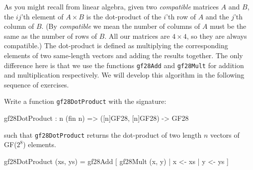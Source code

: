 As you might recall from linear algebra, given two \emph{compatible}
matrices $A$ and $B$, the $ij$'th element of $A\times B$ is the
dot-product of the $i$'th row of $A$ and the $j$'th column of $B$.
(By \emph{compatible} we mean the number of columns of $A$ must be the
same as the number of rows of $B$.  All our matrices are $4\times 4$,
so they are always compatible.)  The dot-product is defined as
multiplying the corresponding elements of two same-length vectors and
adding the results together. The only difference here is that we use
the functions {\tt gf28Add} and {\tt gf28Mult} for addition and
multiplication respectively. We will develop this algorithm in the
following sequence of exercises.

\begin{Exercise}\label{ex:aesmc:0}
Write a function {\tt gf28DotProduct} with the signature:
\begin{code}
  gf28DotProduct : {n} (fin n) => ([n]GF28, [n]GF28) -> GF28
\end{code}
such that {\tt gf28DotProduct} returns the dot-product of two length $n$ vectors of GF($2^8$) elements.
\end{Exercise}
\begin{Answer}
\begin{code}
  gf28DotProduct (xs, ys) = gf28Add [ gf28Mult (x, y) | x <- xs
                                                      | y <- ys
                                    ]
\end{code}
\end{Answer}


